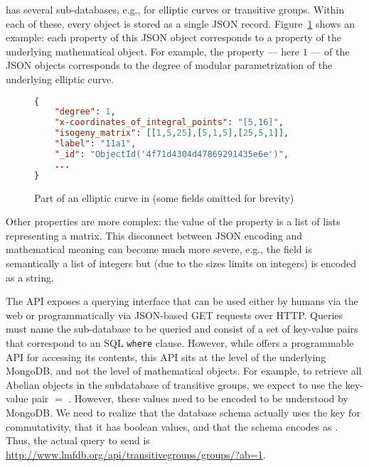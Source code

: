 \lmfdb has several sub-databases, e.g., for elliptic curves or transitive groups. 
Within each of these, every object is stored as a single JSON record.
Figure~\ref{fig:lmfdbexample} shows an example: each property of this JSON object corresponds to a property of the underlying mathematical object. 
For example, the  property --- here $1$ --- of the JSON objects corresponds to the degree of modular parametrization of the underlying elliptic curve. 

\begin{figure}[ht]\centering
\begin{lstlisting}[language=json]
{
    "degree": 1,
    "x-coordinates_of_integral_points": "[5,16]",
    "isogeny_matrix": [[1,5,25],[5,1,5],[25,5,1]],
    "label": "11a1",
    "_id": "ObjectId('4f71d4304d47869291435e6e')",
    ...
}
\end{lstlisting}
  \caption[An elliptic curve from \lmfdb]{
    Part of an elliptic curve in \lmfdb (some fields omitted for brevity)
  }
  \label{fig:lmfdbexample}
\end{figure}

Other properties are more complex: the value of the  property is a list of lists representing a matrix. 
This disconnect between JSON encoding and mathematical meaning can become much more severe, e.g., the  field is semantically a list of integers but (due to the sizes limits on integers) is encoded as a string.

The \lmfdb API \cite{lmfdbapi} exposes a querying interface that can be used either by humans via the web or programmatically via JSON-based GET requests over HTTP.
%
Queries must name the sub-database to be queried and consist of a set of key-value pairs that correspond to an SQL \texttt{where} clause.
However, while \lmfdb offers a programmable API for accessing its contents, this API sits at the level of the underlying MongoDB, and not the level of mathematical objects. 
For example, to retrieve all Abelian objects in the subdatabase of transitive groups, we expect to use the key-value pair $ = $ . 
However, these values need to be encoded to be understood by MongoDB.
We need to realize that the database schema actually uses the key  for commutativity, that it has boolean values, and that the schema encodes  as . 
Thus, the actual query to send is \url{http://www.lmfdb.org/api/transitivegroups/groups/?ab=1}. 

